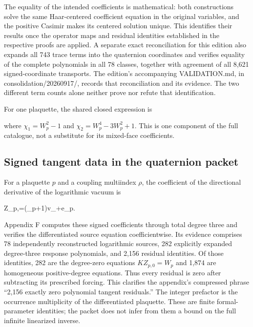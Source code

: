 \documentclass[11pt,a4paper]{article}
\renewcommand{\[}{\begingroup\small\originaldisplaystart}
\renewcommand{\]}{\originaldisplayend\endgroup}
\begin{document}
The equality of the intended coefficients is mathematical: both
constructions solve the same Haar-centered coefficient equation in the
original variables, and the positive Casimir makes its centered solution
unique. This identifies their results once the operator maps and
residual identities established in the respective proofs are applied. A
separate exact reconciliation for this edition also expands all 743
trace terms into the quaternion coordinates and verifies equality of the
complete polynomials in all 78 classes, together with agreement of all
8,621 signed-coordinate transports. The edition's accompanying
{\ttfamily V\allowbreak{}A\allowbreak{}L\allowbreak{}I\allowbreak{}D\allowbreak{}A\allowbreak{}T\allowbreak{}I\allowbreak{}O\allowbreak{}N\allowbreak{}.\allowbreak{}m\allowbreak{}d\allowbreak{}},
in
{\ttfamily c\allowbreak{}o\allowbreak{}n\allowbreak{}s\allowbreak{}o\allowbreak{}l\allowbreak{}i\allowbreak{}d\allowbreak{}a\allowbreak{}t\allowbreak{}i\allowbreak{}o\allowbreak{}n\allowbreak{}/\allowbreak{}2\allowbreak{}0\allowbreak{}2\allowbreak{}6\allowbreak{}0\allowbreak{}9\allowbreak{}1\allowbreak{}7\allowbreak{}/\allowbreak{}},
records that reconciliation and its evidence. The two different term
counts alone neither prove nor refute that identification.

For one plaquette, the shared closed expression is

\[
\]

where \(\chi_1=W_p^2-1\) and \(\chi_2=W_p^4-3W_p^2+1\). This is one
component of the full catalogue, not a substitute for its mixed-face
coefficients.

\subsection{Signed tangent data in the quaternion
packet}\label{signed-tangent-data-in-the-quaternion-packet}

For a plaquette \(p\) and a coupling multiindex \(\rho\), the
coefficient of the directional derivative of the logarithmic vacuum is

\[Z_{p,\rho}=(\rho_p+1)v_{\rho+e_p}.\]

Appendix F computes these signed coefficients through total degree three
and verifies the differentiated source equation coefficientwise. Its
evidence comprises 78 independently reconstructed logarithmic sources,
282 explicitly expanded degree-three response polynomials, and 2,156
residual identities. Of those identities, 282 are the degree-zero
equations \(KZ_{p,0}=W_p\) and 1,874 are homogeneous positive-degree
equations. Thus every residual is zero after subtracting its prescribed
forcing. This clarifies the appendix's compressed phrase ``2,156 exactly
zero polynomial tangent residuals.'' The integer prefactor is the
occurrence multiplicity of the differentiated plaquette. These are
finite formal-parameter identities; the packet does not infer from them
a bound on the full infinite linearized inverse.
\end{document}
